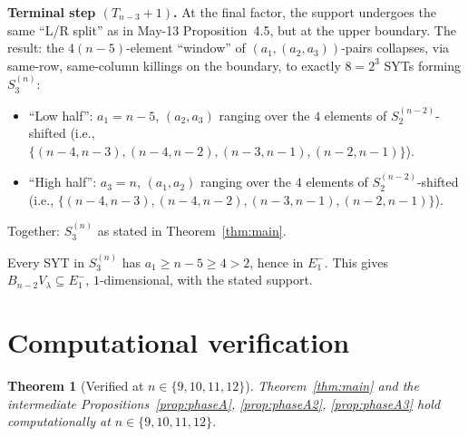 \documentclass[11pt]{article}
\newtheorem{theorem}{Theorem}
\theoremstyle{definition}
\begin{document}
\textbf{Terminal step $(T_{n-3}{+}1)$.}  At the final factor, the
support undergoes the same ``L/R split'' as in May-13 Proposition~4.5,
but at the upper boundary.  The result: the $4(n-5)$-element
``window'' of $(a_1,(a_2,a_3))$-pairs collapses, via same-row,
same-column killings on the boundary, to exactly $8=2^3$ SYTs
forming $S_3^{(n)}$:
\begin{itemize}[leftmargin=2em,topsep=0.3em,itemsep=0.2em]
\item ``Low half'': $a_1=n-5$, $(a_2,a_3)$ ranging over the
$4$ elements of $S_2^{(n-2)}$-shifted (i.e., $\{(n-4,n-3),
(n-4,n-2),(n-3,n-1),(n-2,n-1)\}$).
\item ``High half'': $a_3=n$, $(a_1,a_2)$ ranging over the
$4$ elements of $S_2^{(n-2)}$-shifted (i.e., $\{(n-4,n-3),
(n-4,n-2),(n-3,n-1),(n-2,n-1)\}$).
\end{itemize}
Together: $S_3^{(n)}$ as stated in Theorem~\ref{thm:main}.

Every SYT in $S_3^{(n)}$ has $a_1\ge n-5\ge 4>2$, hence in
$E_1^-$.  This gives $B_{n-2}V_\lambda\subseteq E_1^-$,
$1$-dimensional, with the stated support.

\section{Computational verification}\label{sec:verify}

\begin{theorem}[Verified at $n\in\{9,10,11,12\}$]
Theorem~\ref{thm:main} and the intermediate
Propositions~\ref{prop:phaseA}, \ref{prop:phaseA2},
\ref{prop:phaseA3} hold computationally at $n\in\{9,10,11,12\}$.
\end{theorem}
\end{document}
